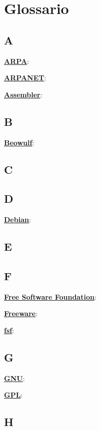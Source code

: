 \section{Glossario}

\subsection{A}

\underline{\textbf{ARPA}}: %

\underline{\textbf{ARPANET}}: %

\underline{\textbf{Assembler}}: %

\subsection{B}

\underline{\textbf{Beowulf}}: %

\subsection{C}

\subsection{D}

\underline{\textbf{Debian}}: %

\subsection{E}

\subsection{F}

\underline{\textbf{Free Software Foundation}}: %

\underline{\textbf{Freeware}}: %

\underline{\textbf{fsf}}: %

\subsection{G}

\underline{\textbf{GNU}}: %

\underline{\textbf{GPL}}: %

\subsection{H}

